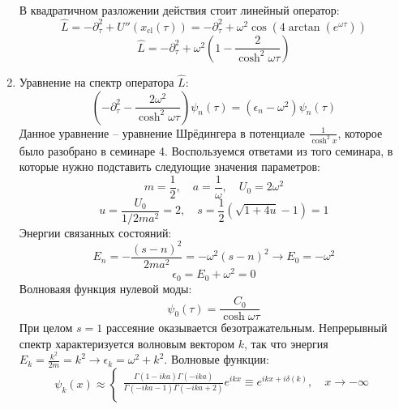 \documentclass[12pt]{article}
\theoremstyle{definition}
\begin{document}
\begin{enumerate}
\begin{equation}
    \end{equation}
    В квадратичном разложении действия стоит линейный оператор:
    \begin{equation}
        \hat{L}=-\partial^2_\tau+U''(x_\text{cl}(\tau))=-\partial^2_\tau+\omega^2\cos\left(4\arctan\left(e^{\omega\tau}\right)\right)
    \end{equation}
    \begin{equation}
        \boxed{\hat{L}=-\partial^2_\tau+\omega^2\left(1-\frac{2}{\cosh^2\omega\tau}\right)}
    \end{equation}
    \item Уравнение на спектр оператора $\hat{L}$:
    \begin{equation}
        \left(-\partial^2_\tau-\frac{2\omega^2}{\cosh^2\omega\tau}\right)\psi_n(\tau)=(\epsilon_n-\omega^2)\psi_n(\tau)
    \end{equation}
    Данное уравнение -- уравнение Шрёдингера в потенциале $\frac{1}{\cosh^2x}$, которое было разобрано в семинаре 4. Воспользуемся ответами из того семинара, в которые нужно подставить следующие значения параметров:
    \begin{equation}
        m=\frac{1}{2},\quad a=\frac{1}{\omega},\quad U_0=2\omega^2
    \end{equation}
    \begin{equation}
        u=\frac{U_0}{1/2ma^2}=2,\quad s=\frac{1}{2}(\sqrt{1+4u}-1)=1
    \end{equation}
    Энергии связанных состояний:
    \begin{equation}
        E_n=-\frac{(s-n)^2}{2ma^2}=-\omega^2(s-n)^2\rightarrow E_0=-\omega^2
    \end{equation}
    \begin{equation}
        \boxed{\epsilon_0=E_0+\omega^2=0}
    \end{equation}
    Волноваяя функция нулевой моды:
    \begin{equation}
        \psi_0(\tau)=\frac{C_0}{\cosh\omega\tau}
    \end{equation}
    При целом $s=1$ рассеяние оказывается безотражательным. Непрерывный спектр характеризуется волновым вектором $k$, так что энергия $E_k=\frac{k^2}{2m}=k^2\rightarrow\epsilon_k=\omega^2+k^2$. Волновые функции:
    \begin{equation}
        \psi_k(x)\approx\begin{cases}
            \frac{\Gamma(1-ika)\Gamma(-ika)}{\Gamma(-ika-1)\Gamma(-ika+2)}e^{ikx}\equiv e^{ikx+i\delta(k)},\quad x\rightarrow-\infty\\

\end{cases}
\end{equation}
\end{enumerate}
\end{document}
